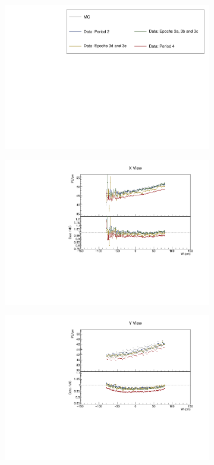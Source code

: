\documentclass[12pt,a4paper]{article}
\begin{document}
\begin{figure}[!ht]
  \begin{subfigure}{\textwidth}
  \centering
    \includegraphics[height=0.2\linewidth]{essentialsec_tb/legend.pdf}
  \end{subfigure}
  \vspace*{2mm}
  
  \begin{subfigure}{0.5\textwidth}
    \includegraphics[width=\linewidth]{essentialsec_tb/pecm_w_x.pdf}
  \end{subfigure}
  \begin{subfigure}{0.5\textwidth}
    \includegraphics[width=\linewidth]{essentialsec_tb/pecm_w_y.pdf}

\end{subfigure}
\end{figure}
\end{document}

